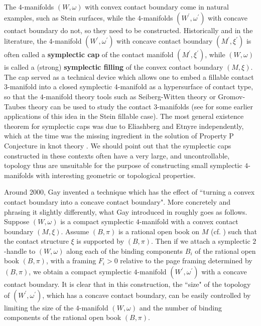 \documentclass[11pt]{amsart}
\theoremstyle{plain}
\numberwithin{theorem}{section}
\theoremstyle{definition}
\begin{document}
The $4$-manifolds $(W,\omega)$ with convex contact boundary come in natural examples, such
as Stein surfaces, while the $4$-manifolds $(W^\prime,\omega^\prime)$ with concave contact boundary do not, so they need to be constructed. Historically and in the literature, the $4$-manifold 
$(W^\prime,\omega^\prime)$ with concave contact boundary $(M^\prime,\xi^\prime)$ is often called a {\bf symplectic cap} of the contact manifold $(M^\prime,\xi^\prime)$, while $(W,\omega)$ is called a (strong) {\bf symplectic filling} of the convex contact boundary $(M,\xi)$. The cap served as a technical device which allows one to embed a fillable contact $3$-manifold into a closed symplectic $4$-manifold as a hypersurface of contact type, so that the $4$-manifold theory tools such as Seiberg-Witten theory or Gromov-Taubes theory can be used to study the contact $3$-manifolds
(see \cite{PM0, C00} for some earlier applications of this idea in the Stein fillable case). The most general existence theorem for symplectic caps was due to Eliashberg \cite{Eli} and 
Etnyre \cite{Etn} independently, which at the time was the missing ingredient in the solution of Property P Conjecture in knot theory \cite{KM}. We should point out that the symplectic caps constructed in these contexts often have a very large, and uncontrollable, topology thus are unsuitable for the purpose of constructing small symplectic $4$-manifolds with interesting geometric or topological properties. 

Around 2000, Gay \cite{G} invented a technique which has the effect of ``turning a convex
contact boundary into a concave contact boundary". More concretely and phrasing it slightly differently, what Gay introduced in \cite{G} roughly goes as follows. Suppose $(W,\omega)$ is a compact symplectic $4$-manifold with a convex contact boundary $(M,\xi)$. Assume $(B,\pi)$ is a rational open book on $M$ (cf. \cite{BEV}) such that the contact structure $\xi$ is supported by $(B,\pi)$. Then if we attach a symplectic $2$-handle to $(W,\omega)$ along each of the binding components $B_i$ of the rational open book $(B,\pi)$, with a framing $F_i>0$ relative to the page framing determined by 
$(B,\pi)$, we obtain a compact symplectic $4$-manifold $(W^\prime,\omega^\prime)$ with a concave contact boundary. It is clear that in this construction, the ``size" of the topology of 
$(W^\prime,\omega^\prime)$, which has a concave contact boundary, can be easily controlled by limiting the size of the $4$-manifold $(W,\omega)$ and the number of binding components of the rational open book $(B,\pi)$. 
\end{document}
